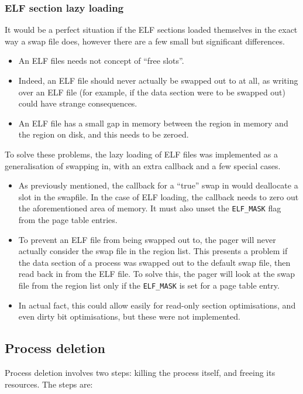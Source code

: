 \documentclass[12pt,english]{article}
\begin{document}
\subsubsection{ELF section lazy loading}

It would be a perfect situation if the ELF sections loaded themselves in the exact way a swap file does, however there are a few small but significant differences.
\begin{itemize}
\item An ELF files needs not concept of ``free slots''.
\item Indeed, an ELF file should never actually be swapped out to at all, as writing over an ELF file (for example, if the data section were to be swapped out) could have strange consequences.
\item An ELF file has a small gap in memory between the region in memory and the region on disk, and this needs to be zeroed.
\end{itemize}

To solve these problems, the lazy loading of ELF files was implemented as a generalisation of swapping in, with an extra callback and a few special cases.
\begin{itemize}
\item As previously mentioned, the callback for a ``true'' swap in would deallocate a slot in the swapfile.  In the case of ELF loading, the callback needs to zero out the aforementioned area of memory.  It must also unset the \texttt{ELF\_MASK} flag from the page table entries.
\item To prevent an ELF file from being swapped out to, the pager will never actually consider the swap file in the region list.  This presents a problem if the data section of a process was swapped out to the default swap file, then read back in from the ELF file.  To solve this, the pager will look at the swap file from the region list only if the \texttt{ELF\_MASK} is set for a page table entry.
\item In actual fact, this could allow easily for read-only section optimisations, and even dirty bit optimisations, but these were not implemented.
\end{itemize}

\subsection{Process deletion} \label{sub:process_delete}

Process deletion involves two steps: killing the process itself, and freeing its resources.  The steps are:
\end{document}
